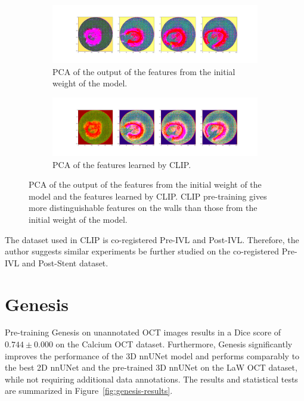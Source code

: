 \documentclass[a4paper,11pt,oneside]{report}
\begin{document}
\begin{figure}[h]
    \centering
    \begin{subfigure}[t]{0.5\textwidth}
        \centering
        \includegraphics[width=\linewidth]{figures/discussion_default_feature_map_batch0_feature1.png}
        \caption{PCA of the output of the features from the initial weight of the model.}
        \label{fig:pca-initial}
    \end{subfigure}%
    \begin{subfigure}[t]{0.5\textwidth}
        \centering
        \includegraphics[width=\linewidth]{figures/discussion_clip_feature_map_batch0_feature1.png}
        \caption{PCA of the features learned by CLIP.}
        \label{fig:pca-clip}
        
    \end{subfigure}
    \caption{PCA of the output of the features from the initial weight of the model and the features learned by CLIP. CLIP pre-training gives more distinguishable features on the walls than those from the initial weight of the model. 
    }
\end{figure}

The dataset used in CLIP is co-registered Pre-IVL and Post-IVL. Therefore, the author suggests similar experiments be further studied on the co-registered Pre-IVL and Post-Stent dataset.

\section{Genesis}
Pre-training Genesis on unannotated OCT images results in a Dice score of $0.744\pm0.000$ on the Calcium OCT dataset. Furthermore, Genesis significantly improves the performance of the 3D nnUNet model and performs comparably to the best 2D nnUNet and the pre-trained 3D nnUNet on the LaW OCT dataset, while not requiring additional data annotations. The results and statistical tests are summarized in Figure~\ref{fig:genesis-results}.
\end{document}
